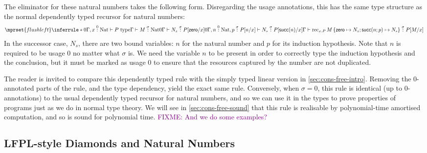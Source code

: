 \documentclass[acmsmall,review]{acmart}
\newcommand{\tmRec}{\mathrm{rec}}
\newcommand{\tyNat}{\mathrm{Nat}}
\newcommand{\conZero}{\mathsf{zero}}
\newcommand{\conSucc}{\mathsf{succ}}
\newcommand{\istype}{\mathrm{type}}
\newcommand{\bob}[1]{\textcolor{purple}{FIXME: #1}}
\begin{document}
The eliminator for these natural numbers takes the following
form. Disregarding the usage annotations, this has the same type
structure as the normal dependently typed recursor for natural
numbers:
\begin{displaymath}
  \mprset{flushleft}
  \inferrule*
  {0\Gamma, x \stackrel0: \tyNat \vdash P~\istype \\\\
    \Gamma \vdash M \stackrel\sigma: \tyNat \\\\
    0\Gamma \vdash N_z \stackrel\sigma: P[\conZero/x] \\\\
    0\Gamma, n \stackrel0: \tyNat, p \stackrel\sigma: P[n/x] \vdash N_s \stackrel\sigma: P[\conSucc(n)/x]}
  {\Gamma \vdash \tmRec_{x.P}\,M\,\{\conZero \mapsto N_z; \conSucc(n;p) \mapsto N_s\} \stackrel\sigma: P[M/x]}
\end{displaymath}
In the successor case, $N_s$, there are two bound variables: $n$ for
the natural number and $p$ for its induction hypothesis. Note that $n$
is required to be usage $0$ no matter what $\sigma$ is. We need the
variable $n$ to be present in order to correctly type the induction
hypothesis and the conclusion, but it must be marked as usage $0$ to
ensure that the resources captured by the number are not duplicated.

The reader is invited to compare this dependently typed rule with the
simply typed linear version in \autoref{sec:cons-free-intro}. Removing
the $0$-annotated parts of the rule, and the type dependency, yield
the exact same rule. Conversely, when $\sigma = 0$, this rule is
identical (up to $0$-annotations) to the usual dependently typed
recursor for natural numbers, and so we can use it in the types to
prove properties of programs just as we do in normal type theory. We
will see in \autoref{sec:cons-free-sound} that this rule is realisable
by polynomial-time amortised computation, and so is sound for
polynomial time. \bob{And we do some examples?}

\subsection{LFPL-style Diamonds and Natural Numbers}
\label{sec:lfpl-qtt}
\end{document}
